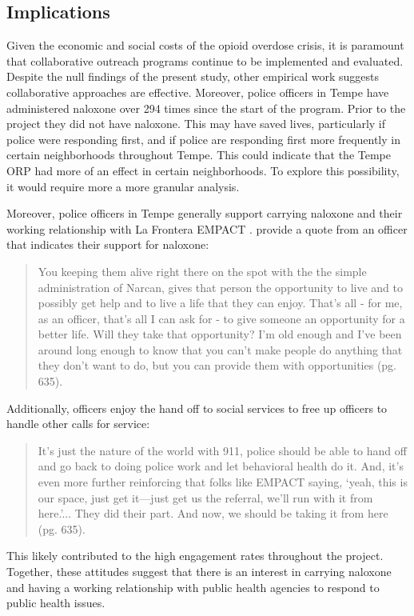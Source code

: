 \subsection{Implications}
Given the economic and social costs of the opioid overdose crisis, it is paramount that collaborative outreach programs continue to be implemented and evaluated. Despite the null findings of the present study, other empirical work suggests collaborative approaches are effective. Moreover, police officers in Tempe have administered naloxone over 294 times since the start of the program. Prior to the project they did not have naloxone. This may have saved lives, particularly if police were responding first, and if police are responding first more frequently in certain neighborhoods throughout Tempe. This could indicate that the Tempe ORP had more of an effect in certain neighborhoods. To explore this possibility, it would require more a more granular analysis. 

Moreover, police officers in Tempe generally support carrying naloxone and their working relationship with La Frontera EMPACT \parencite{white_narcan_2021, white_moving_2021}. \textcite{white_moving_2021} provide a quote from an officer that indicates their support for naloxone:
\begin{quote}
You keeping them alive right there on the spot with the the simple administration of Narcan, gives that person the opportunity to live and to possibly get help and to live a life that they can enjoy. That’s all - for me, as an officer, that’s all I can ask for - to give someone an opportunity for a better life. Will they take that opportunity? I’m old enough and I’ve been around long enough to know that you can’t make people do anything that they don’t want to do, but you can provide them with opportunities (pg. 635).
\end{quote}

\noindent Additionally, officers enjoy the hand off to social services to free up officers to handle other calls for service:
\begin{quote}
It’s just the nature of the world with 911, police should be able to hand off and
go back to doing police work and let behavioral health do it. And, it’s even
more further reinforcing that folks like EMPACT saying, ‘yeah, this is our
space, just get it—just get us the referral, we’ll run with it from here.’... They
did their part. And now, we should be taking it from here (pg. 635).
\end{quote}
\noindent This likely contributed to the high engagement rates throughout the project. Together, these attitudes suggest that there is an interest in carrying naloxone and having a working relationship with public health agencies to respond to public health issues.


